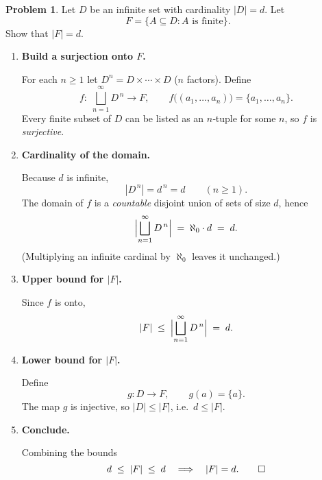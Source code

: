 \documentclass[12pt]{article}
\theoremstyle{definition} %
\newtheorem{problem}{Problem}
\theoremstyle{plain} %
\begin{document}
\begin{problem}
    Let $D$ be an infinite set with cardinality $|D|=d$.  
    Let
    \[
        F=\{A\subseteq D : A\text{ is finite}\}.
    \]
    Show that $|F|=d$.
\end{problem}

\begin{enumerate}
\item \textbf{Build a surjection onto $F$.}

      For each $n\ge 1$ let $D^{n}=D\times\dotsm\times D$ ($n$ factors).  
      Define
      \[
          f:\;\bigsqcup_{n=1}^{\infty} D^{\,n}\longrightarrow F,
          \qquad
          f\bigl((a_{1},\dots,a_{n})\bigr)=\{a_{1},\dots,a_{n}\}.
      \]
      Every finite subset of $D$ can be listed as an $n$‑tuple for some
      $n$, so $f$ is \emph{surjective}.

\item \textbf{Cardinality of the domain.}

      Because $d$ is infinite,
      \[
          |D^{\,n}|=d^{\,n}=d\qquad(n\ge 1).
      \]
      The domain of $f$ is a \emph{countable} disjoint union of sets of
      size $d$, hence
      \[
          \Bigl|\bigsqcup_{n=1}^{\infty} D^{\,n}\Bigr|
          \;=\;
          \aleph_{0}\cdot d
          \;=\;
          d.
      \]
      (Multiplying an infinite cardinal by $\aleph_{0}$ leaves it
      unchanged.)

\item \textbf{Upper bound for $|F|$.}

      Since $f$ is onto,
      \[
          |F|\;\le\;\Bigl|\bigsqcup_{n=1}^{\infty} D^{\,n}\Bigr|
          \;=\;
          d.
      \]

\item \textbf{Lower bound for $|F|$.}

      Define
      \[
          g:D\longrightarrow F,
          \qquad
          g(a)=\{a\}.
      \]
      The map $g$ is injective, so $|D|\le |F|$, i.e.\ $d\le |F|$.

\item \textbf{Conclude.}

      Combining the bounds
      \[
          d\;\le\;|F|\;\le\;d
          \quad\Longrightarrow\quad
          |F|=d.
          \qedhere
      \]
\end{enumerate}
\end{document}

